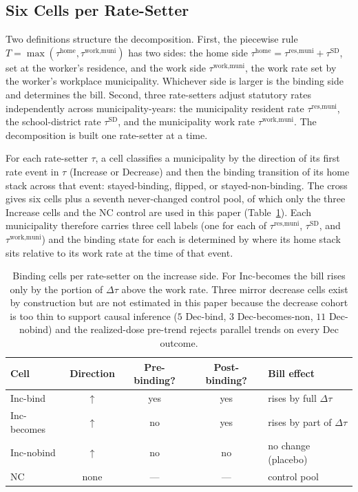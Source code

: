 \documentclass[12pt]{article}
\begin{document}
\subsection{Six Cells per Rate-Setter}
\label{subsec:cells}

Two definitions structure the decomposition. First, the piecewise
rule $T = \max(\tau^{\text{home}}, \tau^{\text{work,muni}})$ has two
sides: the home side
$\tau^{\text{home}} = \tau^{\text{res,muni}} + \tau^{\text{SD}}$,
set at the worker's residence, and the work side
$\tau^{\text{work,muni}}$, the work rate set by the worker's workplace municipality.
Whichever side is larger is the binding side and determines
the bill. Second, three rate-setters adjust statutory rates
independently across municipality-years: the municipality resident
rate $\tau^{\text{res,muni}}$, the school-district rate
$\tau^{\text{SD}}$, and the municipality work rate
$\tau^{\text{work,muni}}$. The decomposition is built one rate-setter
at a time.

For each rate-setter $\tau$, a cell classifies a municipality
by the direction of its first rate event in $\tau$ (Increase or
Decrease) and then the binding transition of its home stack
across that event: stayed-binding, flipped, or stayed-non-binding.
The cross gives six cells plus a seventh never-changed control pool,
of which only the three Increase cells and the NC control are used in
this paper (Table~\ref{tab:cells}). Each municipality therefore carries three
cell labels (one for each of $\tau^{\text{res,muni}}$,
$\tau^{\text{SD}}$, and $\tau^{\text{work,muni}}$) and the binding
state for each is determined by where its home stack sits relative
to its work rate at the time of that event.

\begin{table}[H]
\centering
\small
\begin{tabular}{lcccl}
\toprule
Cell & Direction & Pre-binding? & Post-binding? & Bill effect \\
\midrule
Inc-bind         & $\uparrow$  & yes & yes & rises by full $\Delta\tau$ \\
Inc-becomes      & $\uparrow$  & no  & yes & rises by part of $\Delta\tau$ \\
Inc-nobind       & $\uparrow$  & no  & no  & no change (placebo) \\
NC               & none & --- & --- & control pool \\
\bottomrule
\end{tabular}
\caption{Binding cells per rate-setter on the increase side. For Inc-becomes the bill rises only by the portion of $\Delta\tau$ above the work rate. Three mirror decrease cells exist by construction but are not estimated in this paper because the decrease cohort is too thin to support causal inference ($5$ Dec-bind, $3$ Dec-becomes-non, $11$ Dec-nobind) and the realized-dose pre-trend rejects parallel trends on every Dec outcome.}
\label{tab:cells}
\end{table}
\end{document}
